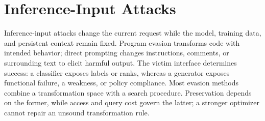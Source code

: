 \documentclass[acmsmall,screen,review]{acmart}
\begin{document}
\section{Inference-Input Attacks} \label{sec:evasion}

Inference-input attacks change the current request while the model, training data, and persistent context remain fixed. Program evasion transforms code with intended behavior; direct prompting changes instructions, comments, or surrounding text to elicit harmful output. The victim interface determines success: a classifier exposes labels or ranks, whereas a generator exposes functional failure, a weakness, or policy compliance. Most evasion methods combine a transformation space with a search procedure. Preservation depends on the former, while access and query cost govern the latter; a stronger optimizer cannot repair an unsound transformation rule.
\end{document}
